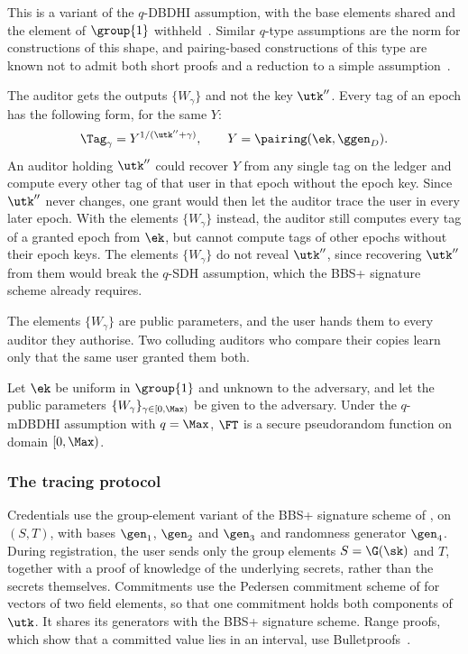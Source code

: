 This is a variant of the $q$-DBDHI assumption, with the base elements shared
and the element of $\group{1}$ withheld~\cite{EC:BonBoy04b,PKC:DodYam05}.
Similar $q$-type assumptions are the norm for constructions of this shape, and
pairing-based constructions of this type are known not to admit both short
proofs and a reduction to a simple assumption~\cite{EC:TCRSTW22,TCC:BHKU22}.

The auditor gets the outputs $\{W_\gamma\}$ and not the key $\utk''$.
Every tag of an epoch has the following form, for the same $Y$:
%
\begin{equation*}
  \Tag_\gamma = Y^{1/(\utk''+\gamma)}, \qquad Y = \pairing(\ek,\ggen_D).
\end{equation*}
%
An auditor holding $\utk''$ could recover $Y$
from any single tag on the ledger and compute every other tag of that user in
that epoch without the epoch key. Since $\utk''$ never changes, one grant would
then let the auditor trace the user in every later epoch. With the elements
$\{W_\gamma\}$ instead, the auditor still computes every tag of a granted epoch
from $\ek$, but cannot compute tags of other epochs without their epoch keys. The
elements $\{W_\gamma\}$ do not reveal $\utk''$, since recovering $\utk''$
from them would break the $q$-SDH assumption, which the BBS+ signature scheme
already requires.

The elements $\{W_\gamma\}$ are public parameters, and the user hands them to
every auditor they authorise. Two colluding auditors who compare their copies
learn only that the same user granted them both.

\begin{lemma}\label{lem:txid-ft-prf} Let $\ek$ be uniform in $\group{1}$ and
unknown to the adversary, and let the public parameters
$\{W_\gamma\}_{\gamma\in[0,\Max)}$ be given to the adversary. Under the
$q$-mDBDHI assumption with $q = \Max$, $\FT$ is a secure pseudorandom
function on domain $[0,\Max)$.  \end{lemma}

\subsubsection{The tracing protocol}\label{sec:txid-protocol-inst}

Credentials use the group-element variant of the BBS+ signature scheme of
, on $(S, T)$, with bases $\gen_1$, $\gen_2$ and $\gen_3$ and
randomness generator $\gen_4$. During registration, the user sends only the group elements $S
= \G(\sk)$ and $T$, together with a proof of knowledge of the underlying
secrets, rather than the secrets themselves. Commitments use the Pedersen commitment scheme of  for
vectors of two field elements, so that one commitment holds both components of
$\utk$. It shares its generators with the BBS+ signature scheme. Range proofs, which show that a committed value lies
in an interval, use Bulletproofs~\cite{SP:BBBPWM18}.

